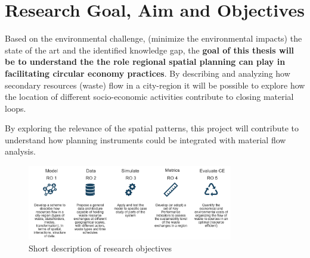\chapter{Research Goal, Aim and Objectives}
Based on the environmental challenge, (minimize the environmental impacts) the state of the art and the identified knowledge gap, the \textbf{goal of this thesis will be to understand the the role regional spatial planning can play in facilitating circular economy practices}. %
By describing and analyzing how secondary resources (waste) flow in a city-region it will be possible to explore how the location of different socio-economic activities contribute to closing material loops. \par
By exploring the relevance of the spatial patterns, this project will contribute to understand how planning instruments could be integrated with material flow analysis.\par


\begin{figure}[h!]
    \centering
    \includegraphics[width=0.8\textwidth]{sections/asset/ros.PNG}
    \caption{Short description of research objectives}
    \label{fig:research objectives}
\end{figure}

